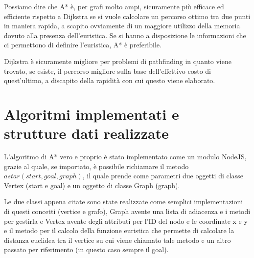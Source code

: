 \documentclass[12pt,a4paper]{report}
\begin{document}
Possiamo dire che A* è, per grafi molto ampi, sicuramente più efficace ed efficiente rispetto a Dijkstra se si vuole calcolare un percorso ottimo tra due punti in maniera rapida, a scapito ovviamente di un maggiore utilizzo della memoria dovuto alla presenza dell'euristica. Se si hanno a disposizione le informazioni che ci permettono di definire l'euristica, A* è preferibile.

Dijkstra è sicuramente migliore per problemi di pathfinding in quanto viene trovato, se esiste, il percorso migliore sulla base dell'effettivo costo di quest'ultimo, a discapito della rapidità con cui questo viene elaborato.


\chapter{Algoritmi implementati e\\strutture dati realizzate}

L'algoritmo di A* vero e proprio è stato implementato come un modulo NodeJS, grazie al quale, se importato, è possibile richiamare il metodo \(astar(start, goal, graph)\), il quale prende come parametri due oggetti di classe Vertex (start e goal) e un oggetto di classe Graph (graph).


Le due classi appena citate sono state realizzate come semplici implementazioni di questi concetti (vertice e grafo), Graph avente una lista di adiacenza e i metodi per gestirla e Vertex avente degli attributi per l'ID del nodo e le coordinate x e y e il metodo per il calcolo della funzione euristica che permette di calcolare la distanza euclidea tra il vertice su cui viene chiamato tale metodo e un altro passato per riferimento (in questo caso sempre il goal).
\\
\end{document}
